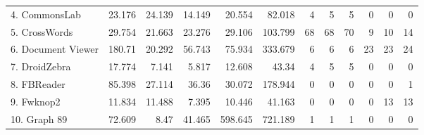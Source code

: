 \begin{table*}[t]
\begin{tabular}{l||r|r|r|r|r||r|r|r||r|r|r}
  4. CommonsLab             & 23.176                & 24.139                   & 14.149                     & 20.554                                     & 82.018                                  & 4                           & 5                            & 5                         & 0                           & 0                            & 0                          \\
  5. CrossWords             & 29.754                & 21.663                   & 23.276                     & 29.106                                     & 103.799                                 & 68                          & 68                           & 70                        & 9                           & 10                           & 14                         \\
  6. Document Viewer        & 180.71                & 20.292                   & 56.743                     & 75.934                                     & 333.679                                 & 6                           & 6                            & 6                         & 23                          & 23                           & 24                         \\
  7. DroidZebra             & 17.774                & 7.141                    & 5.817                      & 12.608                                     & 43.34                                   & 4                           & 5                            & 5                         & 0                           & 0                            & 0                          \\
  8. FBReader               & 85.398                & 27.114                   & 36.36                      & 30.072                                     & 178.944                                 & 0                           & 0                            & 0                         & 0                           & 0                            & 1                          \\
  9. Fwknop2                & 11.834                & 11.488                   & 7.395                      & 10.446                                     & 41.163                                  & 0                           & 0                            & 0                         & 0                           & 13                           & 13                         \\
  10. Graph 89               & 72.609                & 8.47                     & 41.465                     & 598.645                                    & 721.189                                 & 1                           & 1                            & 1                         & 0                           & 0                            & 0                          \\

\end{tabular}
\end{table*}
